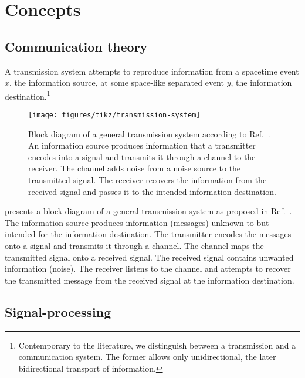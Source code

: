 \section{Concepts}

\subsection{Communication theory}

A transmission system attempts to reproduce information from a spacetime event $x$, the information source, at some space-like separated event $y$, the information destination.\footnote{Contemporary to the literature, we distinguish between a transmission and a communication system. The former allows only unidirectional, the later bidirectional transport of information.}
\begin{figure}[htb]
	\centering
	\texttt{[image: figures/tikz/transmission-system]}
	\caption{Block diagram of a general transmission system according to Ref.~\cite{Shannon1948}. An information source produces information that a transmitter encodes into a signal and transmits it through a channel to the receiver. The channel adds noise from a noise source to the transmitted signal. The receiver recovers the information from the received signal and passes it to the intended information destination.}\label{fig:transmission_system}
\end{figure}
 presents a block diagram of a general transmission system as proposed in Ref.~\cite{Shannon1948}.
The information source produces information (messages) unknown to but intended for the information destination.
The transmitter encodes the messages onto a signal and transmits it through a channel.
The channel maps the transmitted signal onto a received signal.
The received signal contains unwanted information (noise).
The receiver listens to the channel and attempts to recover the transmitted message from the received signal at the information destination.






\subsection{Signal-processing}

